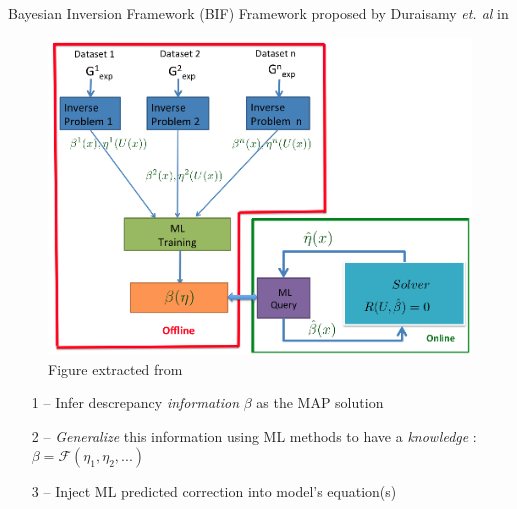 \documentclass[10pt,
			   xcolor=svgnames,
			   hyperref={linkcolor=red, citecolor = DarkGreen, colorlinks=true, urlcolor=Navy}]{beamer}
\newcommand{\bepar}[1]{
	\left( #1 \right)  
}
\newcommand\bk{\color{black}}
\begin{document}
\begin{frame}{Bayesian Inversion Framework (BIF)}
Framework proposed by Duraisamy \textit{et. al} in \citep{parish2016paradigm}
\begin{multicols*}{2}
\noindent
	\begin{figure}[!ht]
	\centering
	\includegraphics[scale=0.32]{singh.png}
	\caption{Figure extracted from \citep{singh2017machine}}
	\end{figure}
	
	\columnbreak

	\begin{itemize}
	\item[1 --] Infer descrepancy \color{BlueViolet} \textit{information} \bk $\beta$ as the MAP solution \\[5mm]
	
	\item[2 --]	\textit{Generalize} this information using ML methods to have a \color{BlueViolet} \textit{knowledge} \bk: $\beta = \mathcal{F}\bepar{\eta_1, \eta_2,...}$ \\[5mm]
 
	\item[3 --] Inject ML predicted correction into model's equation(s) \\[5mm]
	
	\end{itemize}
			
\end{multicols*}
\end{frame}
\end{document}
